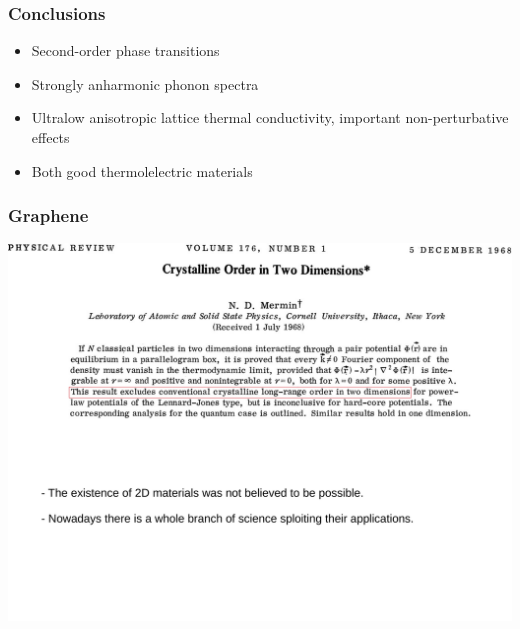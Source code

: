 \documentclass{beamer}
\begin{document}

\begin{frame}

\frametitle{Conclusions}
\begin{itemize}
 \item Second-order phase transitions
 \item Strongly anharmonic phonon spectra
 \item Ultralow anisotropic lattice thermal conductivity, important non-perturbative effects
 \item Both good thermolelectric materials
\end{itemize}

\end{frame}


\begin{frame}

\frametitle{Graphene}
\vspace{0.5cm}
\begin{center}
 \includegraphics[width=0.85\linewidth]{Pictures/Graphene/mermin.pdf}
\end{center}

\end{frame}

\end{document}
